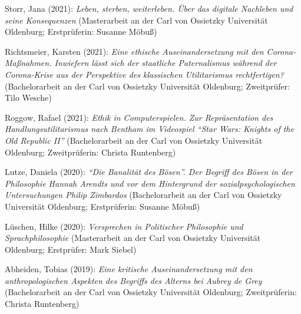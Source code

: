 \documentclass[a4paper,10pt]{article}
\newenvironment{literature}{%
   \parskip6pt\parindent0pt\raggedright
   \def\lititem{\hangindent=1cm\hangafter1}}{%
   \par\ignorespaces}
\begin{document}
\begin{literature}
\lititem Storr, Jana (2021): \textit{Leben, sterben, weiterleben. Über das digitale Nachleben und seine Konsequenzen} (Masterarbeit an der Carl von Ossietzky Universität Oldenburg; Erstprüferin: Susanne Möbuß)

\lititem Richtsmeier, Karsten (2021): \textit{Eine ethische Auseinandersetzung mit den Corona-Maßnahmen. Inwiefern lässt sich der staatliche Paternalismus während der Corona-Krise aus der Perspektive des klassischen Utilitarismus rechtfertigen?} (Bachelorarbeit an der Carl von Ossietzky Universität Oldenburg; Zweitprüfer: Tilo Wesche)

\lititem Roggow, Rafael (2021): \textit{Ethik in Computerspielen. Zur Repräsentation des Handlungsutilitarismus nach Bentham im Videospiel \enquote{Star Wars: Knights of the Old Republic II}} (Bachelorarbeit an der Carl von Ossietzky Universität Oldenburg; Zweitprüferin: Christa Runtenberg)

\lititem Lutze, Daniela (2020): \textit{\enquote{Die Banalität des Bösen}. Der Begriff des Bösen in der Philosophie Hannah Arendts und vor dem Hintergrund der sozialpsychologischen Untersuchungen Philip Zimbardos} (Bachelorarbeit an der Carl von Ossietzky Universität Oldenburg; Erstprüferin: Susanne Möbuß)

\lititem Lüschen, Hilke (2020): \textit{Versprechen in Politischer Philosophie und Sprachphilosophie} (Masterarbeit an der Carl von Ossietzky Universität Oldenburg; Erstprüfer: Mark Siebel)

\lititem Abheiden, Tobias (2019): \textit{Eine kritische Auseinandersetzung mit den anthropologischen Aspekten des Begriffs des Alterns bei Aubrey de Grey} (Bachelorarbeit an der Carl von Ossietzky Universität Oldenburg; Zweitprüferin: Christa Runtenberg)
\end{literature}


\clearpage
\end{document}
